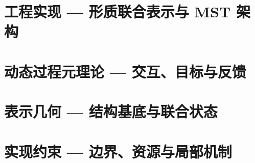 \documentclass[lang=cn,10pt,scheme=chinese]{vendor/elegantbook}
\subtitle{全 117 章完整改写审阅本}
\begin{document}

\maketitle
\frontmatter


\tableofcontents
\mainmatter





\part{工程实现 — 形质联合表示与 MST 架构}




\part{动态过程元理论 — 交互、目标与反馈}




\part{表示几何 — 结构基底与联合状态}










\part{实现约束 — 边界、资源与局部机制}







\end{document}
